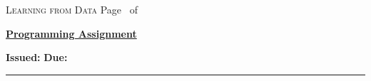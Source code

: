 \documentclass[a4paper, 12pt, answers]{exam}
\begin{document}
\pagestyle{headandfoot}
\runningheadrule


\setcounter{psctr}{4} %

              {\textsc{Learning from Data}}
              { Page \thepage\ of \numpages}
\firstpagefooter{}{}{}
\runningfooter{}{}{}


\newenvironment{Sequation}
   {\stepcounter{Sequ}%
     \addtocounter{equation}{-1}%
     \renewcommand\theequation{S\arabic{Sequ}}\equation}
   {\endequation}

\centering

\centering
\renewcommand{\thequestion}{\arabic{psctr}.\arabic{question}}
\courseheader

\begin{center}
  \underline{\bf Programming Assignment \thepsctr} \\
\end{center}
\begin{flushleft}
  \textbf{Issued:}  \hfill
  \textbf{Due:}  
\end{flushleft}

\hrule 



\vspace{1em}


\end{document}
